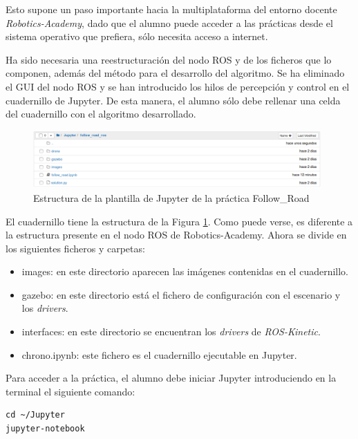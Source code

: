 Esto supone un paso importante hacia la multiplataforma del entorno docente
\textit{Robotics-Academy}, dado que el alumno puede acceder a las prácticas desde el sistema operativo que prefiera, sólo necesita acceso a internet.

Ha sido necesaria una reestructuración del nodo ROS y de los ficheros que lo componen, además del método para el desarrollo del algoritmo. Se ha eliminado el GUI del nodo ROS y se han introducido los hilos de percepción y control en el cuadernillo de Jupyter. De esta manera, el alumno sólo debe rellenar una celda del cuadernillo con el algoritmo desarrollado.

\begin{figure}[H]
  \begin{center}
    \includegraphics[width=0.98\textwidth]{figures/estructura_jupyter_fr.png}
		\caption{Estructura de la plantilla de Jupyter de la práctica Follow\_Road}
		\label{fig.ejfr}
		\end{center}
\end{figure}

El cuadernillo tiene la estructura de la Figura \ref{fig.ejfr}. Como puede verse, es diferente a la estructura presente en el nodo ROS de Robotics-Academy. Ahora se divide en los siguientes ficheros y carpetas:
\begin{itemize}
    \item images: en este directorio aparecen las imágenes contenidas en el cuadernillo.
    \item gazebo: en este directorio está el fichero de configuración con el escenario y los \textit{drivers}.
    \item interfaces: en este directorio se encuentran los \textit{drivers} de \textit{ROS-Kinetic}.
    \item chrono.ipynb: este fichero es el cuadernillo ejecutable en Jupyter.
\end{itemize}

Para acceder a la práctica, el alumno debe iniciar Jupyter introduciendo en la terminal el siguiente comando:

\lstset{language=bash, breaklines=true, basicstyle=\footnotesize}
\begin{lstlisting}[frame=single]
cd ~/Jupyter
jupyter-notebook
\end{lstlisting}

